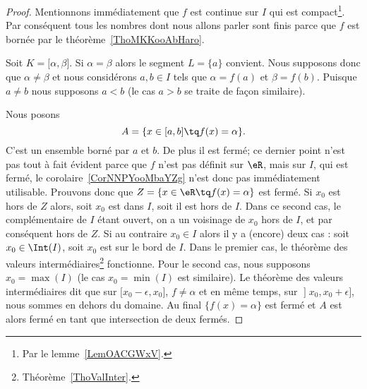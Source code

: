 \begin{proof}
	Mentionnons immédiatement que \( f\) est continue sur \( I\) qui est compact\footnote{Par le lemme~\ref{LemOACGWxV}.}. Par conséquent tous les nombres dont nous allons parler sont finis parce que \( f\) est bornée par le théorème~\ref{ThoMKKooAbHaro}.

	Soit \( K=\mathopen[ \alpha , \beta \mathclose]\). Si \( \alpha=\beta\) alors le segment \( L=\{ a \}\) convient. Nous supposons donc que \( \alpha\neq \beta\) et nous considérons \( a,b\in I\) tels que \( \alpha=f(a)\) et \( \beta=f(b)\). Puisque \( a\neq b\) nous supposons \( a<b\) (le cas \( a>b\) se traite de façon similaire).

	Nous posons
	\begin{equation}
		A=\{ x\in\mathopen[ a , b \mathclose]\tq f(x)=\alpha \}.
	\end{equation}
	C'est un ensemble borné par \( a\) et \( b\). De plus il est fermé; ce dernier point n'est pas tout à fait évident parce que \( f\) n'est pas définit sur \( \eR\), mais sur \( I\), qui est fermé, le corolaire~\ref{CorNNPYooMbaYZg} n'est donc pas immédiatement utilisable. Prouvons donc que \( Z=\{ x\in \eR\tq f(x)=\alpha \}\) est fermé. Si \( x_0\) est hors de \( Z\) alors, soit \( x_0\) est dans \( I\), soit il est hors de \( I\). Dans ce second cas, le complémentaire de \( I\) étant ouvert, on a un voisinage de \( x_0\) hors de \( I\), et par conséquent hors de \( Z\). Si au contraire \( x_0\in I\) alors il y a (encore) deux cas : soit \( x_0\in\Int(I)\), soit \( x_0\) est sur le bord de \( I\). Dans le premier cas, le théorème des valeurs intermédiaires\footnote{Théorème~\ref{ThoValInter}.} fonctionne. Pour le second cas, nous supposons \( x_0=\max(I)\) (le cas \( x_0=\min(I)\) est similaire). Le théorème des valeurs intermédiaires dit que sur \( \mathopen[ x_0-\epsilon , x_0 \mathclose]\), \( f\neq \alpha\) et en même temps, sur \( \mathopen] x_0 , x_0+\epsilon \mathclose]\), nous sommes en dehors du domaine. Au final \( \{ f(x)=\alpha \}\) est fermé et \( A\) est alors fermé en tant que intersection de deux fermés.


\end{proof}
